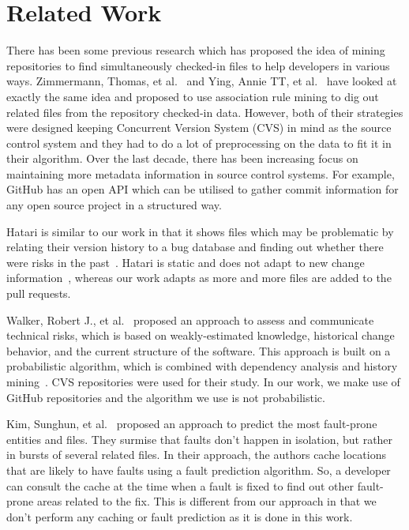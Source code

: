 
\section{Related Work}
\label{sec:related}

There has been some previous research which has proposed the idea of mining repositories to find simultaneously checked-in files to help developers in various ways. Zimmermann, Thomas, et al.~\cite{zimmermann2005mining} and Ying, Annie TT, et al.~\cite{ying2004predicting} have looked at exactly the same idea and proposed to use association rule mining to dig out related files from the repository checked-in data. However, both of their strategies were designed keeping Concurrent Version System (CVS) in mind as the source control system and they had to do a lot of preprocessing on the data to fit it in their algorithm. Over the last decade, there has been increasing focus on maintaining more metadata information in source control systems. For example, GitHub has an open API which can be utilised to gather commit information for any open source project in a structured way.

Hatari is similar to our work in that it shows files which may be problematic by relating their version history to a bug database and finding out whether there were risks in the past~\cite{sliwerski2005hatari}. Hatari is static and does not adapt to new change information~\cite{kim2007predicting}, whereas our work adapts as more and more files are added to the pull requests.

Walker, Robert J., et al.~\cite{walker2006lightweight} proposed an approach to assess and communicate technical risks, which is based on weakly-estimated knowledge, historical change behavior, and the current structure of the software. This approach is built on a probabilistic algorithm, which is combined with dependency analysis and history mining~\cite{lehnert2011review}. CVS repositories were used for their study. In our work, we make use of GitHub repositories and the algorithm we use is not probabilistic.

Kim, Sunghun, et al.~\cite{kim2007predicting} proposed an approach to predict the most fault-prone entities and files. They surmise that faults don't happen in isolation, but rather in bursts of several related files. In their approach, the authors cache locations that are likely to have faults using a fault prediction algorithm. So, a developer can consult the cache at the time when a fault is fixed to find out other fault-prone areas related to the fix. This is different from our approach in that we don't perform any caching or fault prediction as it is done in this work.

